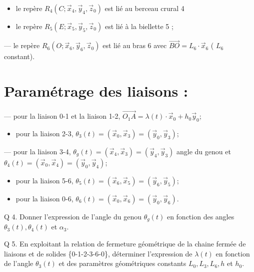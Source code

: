 \documentclass[10pt]{article}
\begin{document}
\begin{itemize}
  \item le repère $R_{4}\left(C ; \vec{x}_{4}, \vec{y}_{4}, \vec{z}_{0}\right)$ est lié au berceau crural 4

  \item le repère $R_{5}\left(E ; \vec{x}_{5}, \vec{y}_{5}, \vec{z}_{0}\right)$ est lié à la biellette 5 ;

\end{itemize}

— le repère $R_{6}\left(O ; \vec{x}_{6}, \vec{y}_{6}, \vec{z}_{0}\right)$ est lié au bras 6 avec $\overrightarrow{B O}=L_{6} \cdot \vec{x}_{6}$ ( $L_{6}$ constant).

\section*{Paramétrage des liaisons :}
— pour la liaison 0-1 et la liaison 1-2, $\overrightarrow{O_{1} A}=\lambda(t) \cdot \vec{x}_{0}+h_{0} \vec{y}_{0}$;

\begin{itemize}
  \item pour la liaison 2-3, $\theta_{3}(t)=\left(\vec{x}_{0}, \vec{x}_{3}\right)=\left(\vec{y}_{0}, \vec{y}_{3}\right)$;
\end{itemize}

— pour la liaison 3-4, $\theta_{g}(t)=\left(\vec{x}_{4}, \vec{x}_{3}\right)=\left(\vec{y}_{4}, \vec{y}_{3}\right)$ angle du genou et $\theta_{4}(t)=\left(\vec{x}_{0}, \vec{x}_{4}\right)=\left(\vec{y}_{0}, \vec{y}_{4}\right)$;

\begin{itemize}
  \item pour la liaison 5-6, $\theta_{5}(t)=\left(\vec{x}_{6}, \vec{x}_{5}\right)=\left(\vec{y}_{6}, \vec{y}_{5}\right)$;

  \item pour la liaison 0-6, $\theta_{6}(t)=\left(\vec{x}_{0}, \vec{x}_{6}\right)=\left(\vec{y}_{0}, \vec{y}_{6}\right)$.

\end{itemize}

Q 4. Donner l'expression de l'angle du genou $\theta_{g}(t)$ en fonction des angles $\theta_{3}(t), \theta_{4}(t)$ et $\alpha_{3}$.

Q 5. En exploitant la relation de fermeture géométrique de la chaine fermée de liaisons et de solides \{0-1-2-3-6-0\}, déterminer l'expression de $\lambda(t)$ en fonction de l'angle $\theta_{3}(t)$ et des paramètres géométriques constants $L_{0}, L_{3}, L_{6}, h$ et $h_{0}$.
\end{document}
